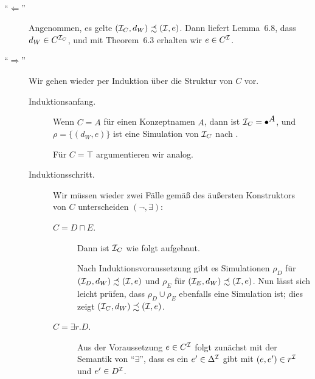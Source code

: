 \documentclass[fontsize=11pt, twoside=false, numbers=autoenddot]{scrbook}
\begin{document}
\goodbreak
\parII
{}~
%
\begin{description}
  \item[{\boldmath "`$\Leftarrow$"'}] 
    Angenommen, es gelte $(\mathcal{I}_C,d_W) \precsim (\mathcal{I},e)$.
    Dann liefert Lemma~6.8, dass $d_W \in C^{\mathcal{I}_C}$,
    und mit Theorem~6.3 erhalten wir $e \in C^\mathcal{I}$.
  \item[{\boldmath "`$\Rightarrow$"'}] 
    Wir gehen wieder per Induktion über die Struktur von $C$ vor.
    \begin{description}
      \item[Induktionsanfang.]
        Wenn $C=A$ für einen Konzeptnamen $A$,
        dann ist $\mathcal{I}_C = \bullet^{\text{{\normalsize $A$}}}$,
        und $\rho = \{(d_W,e)\}$ ist eine Simulation von $\mathcal{I}_C$ nach \Imc.
        
        Für $C=\top$ argumentieren wir analog.
      \item[Induktionsschritt.]
        Wir müssen wieder zwei Fälle gemäß des äußersten Konstruktors
        von $C$ unterscheiden $(\lnot,\exists)$:
        \goodbreak
        \begin{description}
          \item[{\boldmath $C=D \sqcap E$.}]
            Dann ist $\mathcal{I}_C$ wie folgt aufgebaut.
            \begin{center}
            \end{center}
            \parI
            Nach Induktionsvoraussetzung 
            gibt es Simulationen $\rho_D$ für $(\mathcal{I}_D,d_W) \precsim (\mathcal{I},e)$
            und $\rho_E$ für $(\mathcal{I}_E,d_W) \precsim (\mathcal{I},e)$.
            Nun lässt sich leicht prüfen, dass $\rho_D \cup \rho_E$
            ebenfalls eine Simulation ist;
            dies zeigt $(\mathcal{I}_C,d_W) \precsim (\mathcal{I},e)$.
            \parI
          \item[{\boldmath $C=\exists r.D$.}]
            Aus der Voraussetzung $e \in C^\mathcal{I}$
            folgt zunächst mit der Semantik von "`$\exists$"',
            dass es ein $e' \in \Delta^\mathcal{I}$ gibt mit
            $(e,e') \in r^\mathcal{I}$ und $e' \in D^\mathcal{I}$.
            

\end{description}
\end{description}
\end{description}
\end{document}
